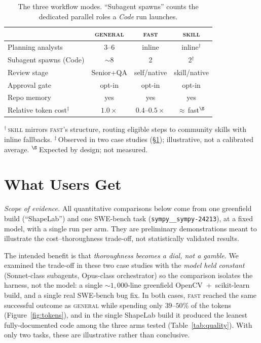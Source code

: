 \documentclass{article}
\begin{document}
\begin{table}[t]
\caption{The three workflow modes. ``Subagent spawns'' counts the dedicated
parallel roles a \emph{Code} run launches.}
\label{tab:modes}
\vskip 0.05in
\begin{center}
\begin{small}
\setlength{\tabcolsep}{3.4pt}
\begin{tabular}{lccc}
\toprule
 & \textsc{general} & \textsc{fast} & \textsc{skill}\\
\midrule
Planning analysts      & 3--6        & inline      & inline$^{\dagger}$\\
Subagent spawns (Code) & $\sim$8     & 2           & 2$^{\dagger}$\\
Review stage           & Senior+QA   & self/native & skill/native\\
Approval gate          & opt-in      & opt-in      & opt-in\\
Repo memory            & yes         & yes         & yes\\
Relative token cost$^{\ddagger}$ & $1.0\times$ & $0.4$--$0.5\times$ & $\approx$\,fast$^{\S}$\\
\bottomrule
\end{tabular}
\end{small}
\end{center}
{\footnotesize $^{\dagger}$\,\textsc{skill} mirrors \textsc{fast}'s structure,
routing eligible steps to community skills with inline fallbacks.
$^{\ddagger}$\,Observed in two case studies (\S\ref{sec:benefits}); illustrative,
not a calibrated average. $^{\S}$\,Expected by design; not measured.}
\vskip -0.15in
\end{table}

\section{What Users Get}
\label{sec:benefits}

\emph{Scope of evidence.} All quantitative comparisons below come from one
greenfield build (``ShapeLab'') and one SWE-bench task
(\texttt{sympy\_\_sympy-24213}), at a fixed model, with a single run per arm. They
are preliminary demonstrations meant to illustrate the cost--thoroughness
trade-off, not statistically validated results.

The intended benefit is that \emph{thoroughness becomes a dial, not a gamble}. We
examined the trade-off in these two case studies with the \emph{model held
constant} (Sonnet-class subagents, Opus-class orchestrator) so the comparison
isolates the harness, not the model: a single ${\sim}1{,}000$-line greenfield
OpenCV~+~scikit-learn build, and a single real SWE-bench bug fix. In both cases,
\textsc{fast} reached the same successful outcome as \textsc{general} while
spending only $39$--$50\%$ of the tokens (Figure~\ref{fig:tokens}), and in the
single ShapeLab build it produced the leanest fully-documented code among the
three arms tested (Table~\ref{tab:quality}). With only two tasks, these are
illustrative rather than conclusive.
\end{document}
